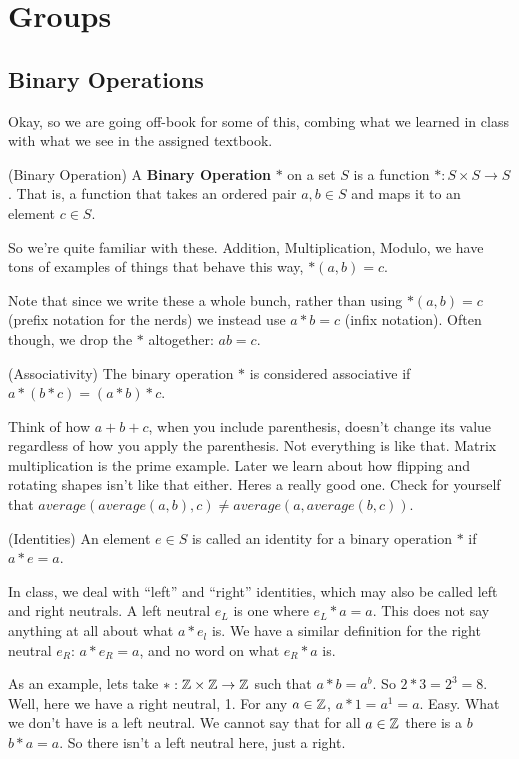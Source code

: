 \chapter{Groups}

\section{Binary Operations}
Okay, so we are going off-book for some of this, combing what we learned in class with what we see in the assigned textbook.

 (Binary Operation) A \textbf{Binary Operation} \(*\) on a set \(S\) is a function \(*: S \times S \rightarrow S\). That is, a function that takes an ordered pair \(a, b \in S\) and maps it to an element \(c \in S\).

So we're quite familiar with these. Addition, Multiplication, Modulo, we have tons of examples of things that behave this way, \(*(a,b) = c\).

Note that since we write these a whole bunch, rather than using \(*(a,b) = c\) (prefix notation for the nerds) we instead use \(a * b = c\) (infix notation). Often though, we drop the \(*\) altogether: \(ab = c\).

 (Associativity) The binary operation \(*\) is considered associative if \(a * (b * c) = (a * b) * c\).

Think of how \(a + b + c\), when you include parenthesis, doesn't change its value regardless of how you apply the parenthesis. Not everything is like that. Matrix multiplication is the prime example. Later we learn about how flipping and rotating shapes isn't like that either. Heres a really good one. Check for yourself that \(average(average(a ,b), c) \neq average(a, average(b, c))\).

 (Identities) An element \(e \in S\) is called an identity for a binary operation \(*\) if \(a * e = a\).

In class, we deal with ``left''  and ``right'' identities, which may also be called left and right neutrals. A left neutral \(e_L\) is one where \(e_L * a = a\). This does not say anything at all about what \(a * e_l\) is. We have a similar definition for the right neutral \(e_R\): \(a * e_R = a\), and no word on what \(e_R * a\) is.

As an example, lets take \(*: \mathbb{Z} \times \mathbb{Z} \rightarrow \mathbb{Z}\) such that \(a*b = a^b\). So \(2 * 3 = 2^3 = 8\). Well, here we have a right neutral, 1. For any \(a \in \mathbb{Z}\), \(a * 1 = a^1 = a\). Easy. What we don't have is a left neutral. We cannot say that for all \(a \in \mathbb{Z}\) there is a \(b\) \(b*a = a\). So there isn't a left neutral here, just a right.

